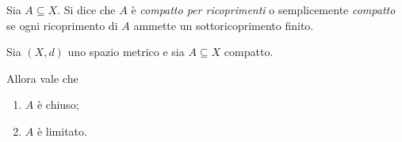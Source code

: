 \begin{definition}
     \label{def:compatto_ricopr}
    Sia $A \subseteq X$. Si dice che $A$ è \emph{compatto per ricoprimenti} o semplicemente \emph{compatto} se ogni ricoprimento di $A$ ammette un sottoricoprimento finito.
\end{definition}

\begin{proposition}
    Sia $(X, d)$ uno spazio metrico e sia $A \subseteq X$ compatto.

    Allora vale che \begin{enumerate}[label={(\roman*)}]
        \item $A$ è chiuso;
        \item $A$ è limitato.
    \end{enumerate}
\end{proposition}
